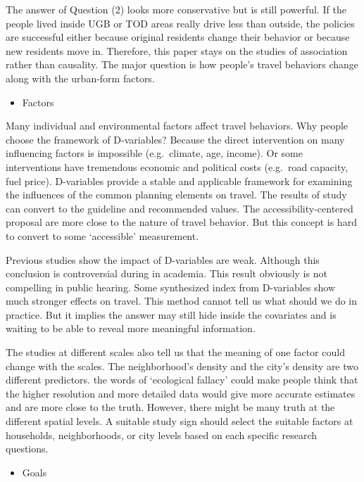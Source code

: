 \documentclass[
  11pt,
  openany]{memoir}
\providecommand{\tightlist}{%
  \setlength{\itemsep}{0pt}\setlength{\parskip}{0pt}}
\begin{document}
The answer of Question (2) looks more conservative but is still powerful. If the people lived inside UGB or TOD areas really drive less than outside, the policies are successful either because original residents change their behavior or because new residents move in.
Therefore, this paper stays on the studies of association rather than causality.
The major question is how people's travel behaviors change along with the urban-form factors.

\begin{itemize}
\tightlist
\item
  Factors
\end{itemize}

Many individual and environmental factors affect travel behaviors. Why people choose the framework of D-variables?
Because the direct intervention on many influencing factors is impossible (e.g.~climate, age, income).
Or some interventions have tremendous economic and political costs (e.g.~road capacity, fuel price).
D-variables provide a stable and applicable framework for examining the influences of the common planning elements on travel.
The results of study can convert to the guideline and recommended values.
The accessibility-centered proposal are more close to the nature of travel behavior. But this concept is hard to convert to some `accessible' measurement.

Previous studies show the impact of D-variables are weak. Although this conclusion is controversial during in academia.
This result obviously is not compelling in public hearing.
Some synthesized index from D-variables show much stronger effects on travel. This method cannot tell us what should we do in practice.
But it implies the answer may still hide inside the covariates and is waiting to be able to reveal more meaningful information.

The studies at different scales also tell us that the meaning of one factor could change with the scales.
The neighborhood's density and the city's density are two different predictors.
the words of `ecological fallacy' could make people think that the higher resolution and more detailed data would give more accurate estimates and are more close to the truth.
However, there might be many truth at the different spatial levels.
A suitable study sign should select the suitable factors at households, neighborhoods, or city levels based on each specific research questions.

\begin{itemize}
\tightlist
\item
  Goals
\end{itemize}
\end{document}
